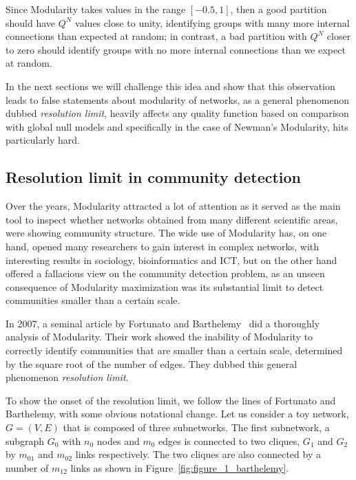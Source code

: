 Since Modularity takes values in the range $[-0.5,1]$, then a good partition should have $Q^N$ values close to unity, identifying groups with many more internal connections than expected at random; in contrast, a bad partition with $Q^N$ closer to zero should identify groups with no more internal connections than we expect at random.

In the next sections we will challenge this idea and show that this observation leads to false statements about modularity of networks, as a general phenomenon dubbed \emph{resolution limit}, heavily affects any quality function based on comparison with global null models and specifically in the case of Newman's Modularity, hits particularly hard.

\subsection{Resolution limit in community detection}\label{sec:resolutionlimit}
Over the years, Modularity attracted a lot of attention as it served as the main tool to inspect whether networks obtained from many different scientific areas, were showing community structure.
The wide use of Modularity has, on one hand, opened many researchers to gain interest in complex networks, with interesting results in sociology, bioinformatics and ICT, but on the other hand offered a fallacious view on the community detection problem, as an unseen consequence of Modularity maximization was its substantial limit to detect communities smaller than a certain scale.

In 2007, a seminal article by Fortunato and Barthelemy~\cite{fortunato2007} did a thoroughly analysis of Modularity. Their work showed the inability of Modularity to correctly identify communities that are smaller than a certain scale, determined by the square root of the number of edges. They dubbed this general phenomenon \emph{resolution limit}.

To show the onset of the resolution limit, we follow the lines of Fortunato and Barthelemy, with some obvious notational change. Let us consider a toy network, $G=(V,E)$ that is composed of three subnetworks.
The first subnetwork, a subgraph $G_0$ with $n_0$ nodes and $m_0$ edges is connected to two cliques, $G_1$ and $G_2$ by $m_{01}$ and $m_{02}$ links respectively. The two cliques are also connected by a number of $m_{12}$ links as shown in Figure~\ref{fig:figure_1_barthelemy}.

